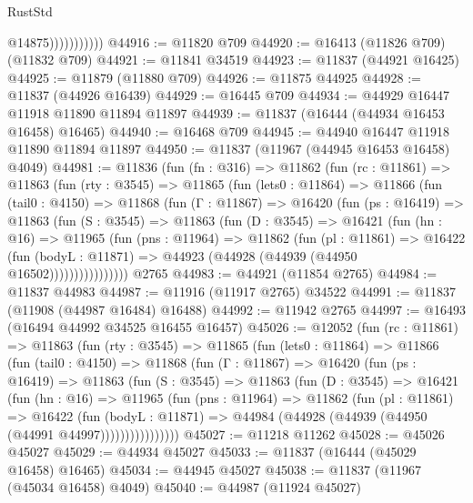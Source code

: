 \begin{lexlean}{RustStd}
\begin{coremodule}
{\begin{coremodule}
{{{{{{{{{{{{{{{{{{{{{{{{{{{{{{{{{{{{{{{{{{{{{{{{{{                          @14875)))))))))))
@44916 := @11820 @709
@44920 := @16413 (@11826 @709) (@11832 @709)
@44921 := @11841 @34519
@44923 := @11837 (@44921 @16425)
@44925 := @11879 (@11880 @709)
@44926 := @11875 @44925
@44928 := @11837 (@44926 @16439)
@44929 := @16445 @709
@44934 := @44929 @16447 @11918 @11890 @11894 @11897
@44939 := @11837 (@16444 (@44934 @16453 @16458) @16465)
@44940 := @16468 @709
@44945 := @44940 @16447 @11918 @11890 @11894 @11897
@44950 := @11837 (@11967 (@44945 @16453 @16458) @4049)
@44981 := @11836
    (fun (fn : @316) =>
    @11862
      (fun (rc : @11861) =>
      @11863
        (fun (rty : @3545) =>
        @11865
          (fun (lets0 : @11864) =>
          @11866
            (fun (tail0 : @4150) =>
            @11868
              (fun (Γ : @11867) =>
              @16420
                (fun (ps : @16419) =>
                @11863
                  (fun (S : @3545) =>
                  @11863
                    (fun (D : @3545) =>
                    @16421
                      (fun (hn : @16) =>
                      @11965
                        (fun (pns : @11964) =>
                        @11862
                          (fun (pl : @11861) =>
                          @16422
                            (fun (bodyL : @11871) =>
                            @44923 (@44928 (@44939 (@44950 @16502))))))))))))))))
    @2765
@44983 := @44921 (@11854 @2765)
@44984 := @11837 @44983
@44987 := @11916 (@11917 @2765) @34522
@44991 := @11837 (@11908 (@44987 @16484) @16488)
@44992 := @11942 @2765
@44997 := @16493 (@16494 @44992 @34525 @16455 @16457)
@45026 := @12052
    (fun (rc : @11861) =>
    @11863
      (fun (rty : @3545) =>
      @11865
        (fun (lets0 : @11864) =>
        @11866
          (fun (tail0 : @4150) =>
          @11868
            (fun (Γ : @11867) =>
            @16420
              (fun (ps : @16419) =>
              @11863
                (fun (S : @3545) =>
                @11863
                  (fun (D : @3545) =>
                  @16421
                    (fun (hn : @16) =>
                    @11965
                      (fun (pns : @11964) =>
                      @11862
                        (fun (pl : @11861) =>
                        @16422
                          (fun (bodyL : @11871) =>
                          @44984 (@44928 (@44939 (@44950 (@44991 @44997))))))))))))))))
@45027 := @11218 @11262
@45028 := @45026 @45027
@45029 := @44934 @45027
@45033 := @11837 (@16444 (@45029 @16458) @16465)
@45034 := @44945 @45027
@45038 := @11837 (@11967 (@45034 @16458) @4049)
@45040 := @44987 (@11924 @45027)
}}}}}}}}}}}}}}}}}}}}}}}}}}}}}}}}}}}}}}}}}}}}}}}}}}
\end{coremodule}}
\end{coremodule}
\end{lexlean}
